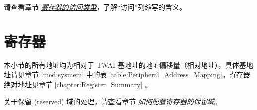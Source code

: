\documentclass[main\_\_CN.tex]{subfiles}
\begin{document}
请查看章节 \hyperref[glossary-access-types]{\textit{寄存器的访问类型}}，了解“访问”列缩写的含义。



\section{寄存器}
\label{chapter:Register_Description}
本小节的所有地址均为相对于 TWAI 基地址的地址偏移量（相对地址），具体基地址请见章节 \ref{mod:sysmem} \textit{} 中的表 \ref{table:Peripheral_Address_Mapping}。寄存器绝对地址见章节 \ref{chapter:Register_Summary} \textit{}。

关于保留 (reserved) 域的处理，请查看章节 \hyperref[programming-reserved-field]{\textit{如何配置寄存器的保留域}}。



\end{document}
